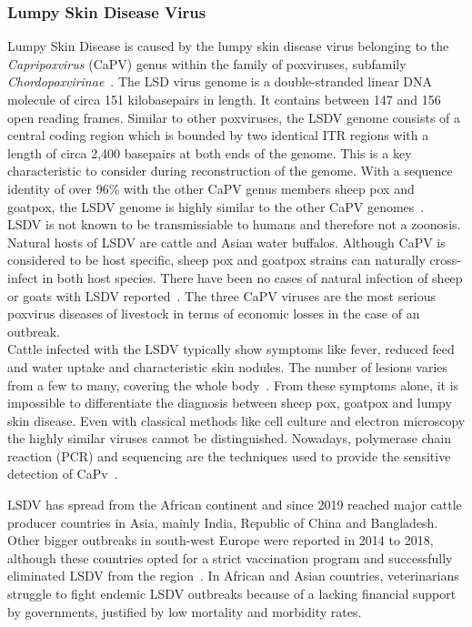 \subsubsection*{Lumpy Skin Disease Virus}
Lumpy Skin Disease is caused by the lumpy skin disease virus belonging to the \textit{Capripoxvirus} (CaPV) genus within the family of poxviruses, subfamily \textit{Chordopoxvirinae}~\cite{walker2019changes}. The LSD virus genome is a double-stranded linear DNA molecule of circa 151 kilobasepairs in length. It contains between 147 and 156 open reading frames. Similar to other poxviruses, the LSDV genome consists of a central coding region which is bounded by two identical ITR regions with a length of circa 2,400 basepairs at both ends of the genome. This is a key characteristic to consider during reconstruction of the genome. With a sequence identity of over 96\% with the other CaPV genus members sheep pox and goatpox, the LSDV genome is highly similar to the other CaPV genomes~\cite{tulman2001genome}. \\
LSDV is not known to be transmissiable to humans and therefore not a zoonosis. Natural hosts of LSDV are cattle and Asian water buffalos. Although CaPV is considered to be host specific, sheep pox and goatpox strains can naturally cross-infect in both host species. There have been no cases of natural infection of sheep or goats with LSDV reported~\cite{namazi2021lumpy}. The three CaPV viruses are the most serious poxvirus diseases of livestock in terms of economic losses in the case of an outbreak. \\
Cattle infected with the LSDV typically show symptoms like fever, reduced feed and water uptake and characteristic skin nodules. The number of lesions varies from a few to many, covering the whole body~\cite{prozesky1982study}. From these symptoms alone, it is impossible to differentiate the diagnosis between sheep pox, goatpox and lumpy skin disease. Even with classical methods like cell culture and electron microscopy the highly similar viruses cannot be distinguished. Nowadays, polymerase chain reaction (PCR) and sequencing are the techniques used to provide the sensitive detection of CaPv~\cite{lafar2020capripoxvirus}.

LSDV has spread from the African continent and since 2019 reached major cattle producer countries in Asia, mainly India, Republic of China and Bangladesh. Other bigger outbreaks in south-west Europe were reported in 2014 to 2018, although these countries opted for a strict vaccination program and successfully eliminated LSDV from the region~\cite{prevention2017control}. In African and Asian countries, veterinarians struggle to fight endemic LSDV outbreaks because of a lacking financial support by governments, justified by low mortality and morbidity rates.

